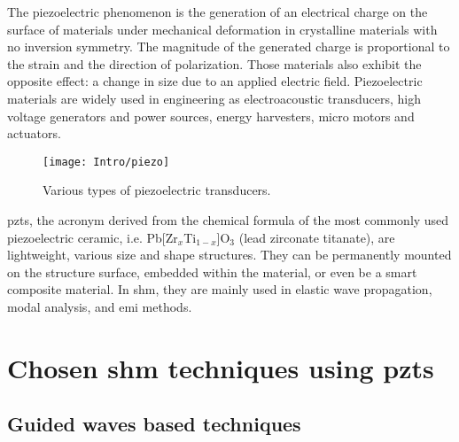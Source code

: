 \documentclass[11pt,a4paper,final]{report}
\begin{document}
The piezoelectric phenomenon is the generation of an electrical charge on the surface of materials under mechanical deformation in crystalline materials with no inversion symmetry.
The magnitude of the generated charge is proportional to the strain and the direction of polarization.
Those materials also exhibit the opposite effect: a change in size due to an applied electric field.
Piezoelectric materials are widely used in engineering as electroacoustic transducers, high voltage generators and power sources, energy harvesters, micro motors and actuators.
\begin{figure}[H]
\texttt{[image: Intro/piezo]}
\caption{Various types of piezoelectric transducers.}
	\label{fig:piezo}
\end{figure}
\Acp{pzt}, the acronym derived from the chemical formula of the most commonly used piezoelectric ceramic, i.e. Pb[Zr\(_x\)Ti\(_{1-x}\)]O\(_3\) (lead zirconate titanate), are lightweight, various size and shape structures. 
They can be permanently mounted on the structure surface, embedded within the material, or even be a smart composite material.
In \ac{shm}, they are mainly used in elastic wave propagation, modal analysis, and \ac{emi} methods. \section{Chosen \ac{shm} techniques using \acp{pzt}}
\label{sec:techniques}



\subsection{Guided waves based techniques}
\end{document}
